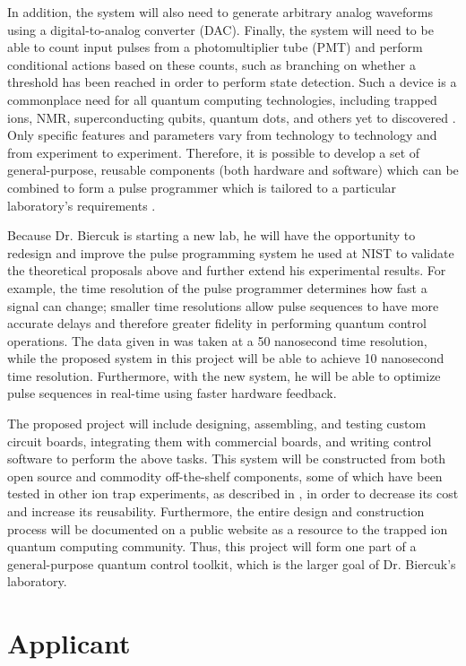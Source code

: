\documentclass{article}
\begin{document}
In addition, the system will also need to generate arbitrary analog waveforms using
a digital-to-analog converter (DAC).
Finally, the system will need to be able to count input pulses from a
photomultiplier tube (PMT) and perform conditional actions based on these
counts, such as branching on whether a threshold has been reached in order to
perform state detection.
Such a
device is a commonplace need for all quantum computing technologies,
including trapped ions,
NMR, superconducting qubits, quantum dots, and others yet to discovered
\cite{Pham2005}. Only specific
features and parameters vary from technology to technology and from experiment
to experiment. Therefore, it is possible to develop a set of
general-purpose, reusable components (both hardware and software)
which can be combined to form a pulse
programmer which is tailored to a particular laboratory's requirements
\cite{Petersen2007} \cite{Schindler2008}.

Because Dr. Biercuk is starting a new lab, he will have the
opportunity to redesign and improve the pulse programming system he
used at NIST
to validate the theoretical proposals above and further extend his
experimental results. For example, the time resolution of the pulse programmer
determines how fast a signal can change; smaller time resolutions allow
pulse sequences to have more accurate delays and therefore greater fidelity
in performing quantum control operations. The data given in \cite{BUVSIB2009c}
was taken at a 50 nanosecond time resolution, while the proposed system in this project
will be
able to achieve 10 nanosecond time resolution. Furthermore, with the new system,
he will be able to optimize pulse sequences in real-time using
faster hardware feedback.

The proposed project will include designing, assembling, and testing
custom circuit boards, integrating them with commercial boards, and
writing control software to perform the above tasks.
This system will be constructed from both
open source and commodity off-the-shelf components, some of which have been
tested in other ion trap experiments, as described in \cite{pp2005},
in order to decrease
its cost and increase its reusability.
Furthermore, the entire design and construction process will be documented
on a public website \cite{pp2005} as a resource to the trapped ion
quantum computing community.
Thus, this project will form one part of a general-purpose quantum control toolkit,
which is the larger goal of Dr. Biercuk's laboratory.

\section{Applicant}
\end{document}
